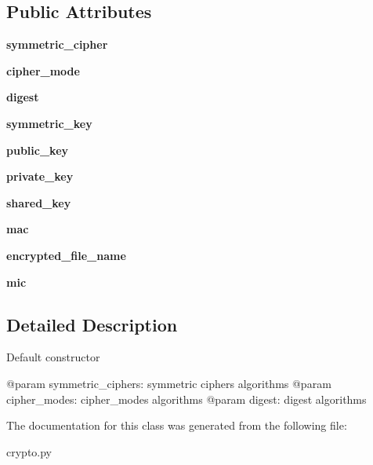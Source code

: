 \subsection*{Public Attributes}
\begin{DoxyCompactItemize}
\item 
\mbox{\label{classcrypto_1_1Crypto_ab5dad6394c3cecc06d883714d5611b62}} 
{\bfseries symmetric\+\_\+cipher}
\item 
\mbox{\label{classcrypto_1_1Crypto_aeac86424f33c6c441466ab4d29b5b95a}} 
{\bfseries cipher\+\_\+mode}
\item 
\mbox{\label{classcrypto_1_1Crypto_ad7038643480e969f1b6e89477e0601ad}} 
{\bfseries digest}
\item 
\mbox{\label{classcrypto_1_1Crypto_ae2441862a6341036638b064f6d625b3b}} 
{\bfseries symmetric\+\_\+key}
\item 
\mbox{\label{classcrypto_1_1Crypto_a0433ad7078ca0f9dc1633601d0e7b1db}} 
{\bfseries public\+\_\+key}
\item 
\mbox{\label{classcrypto_1_1Crypto_a7ec399ba9094ac42c752a65de8475053}} 
{\bfseries private\+\_\+key}
\item 
\mbox{\label{classcrypto_1_1Crypto_a200cf33f4b2685b21d02b32456c27078}} 
{\bfseries shared\+\_\+key}
\item 
\mbox{\label{classcrypto_1_1Crypto_a7e6bcc7d0319044f7b62723148a0a0f4}} 
{\bfseries mac}
\item 
\mbox{\label{classcrypto_1_1Crypto_a859d1d8c69b75a8357229b4af93ce54e}} 
{\bfseries encrypted\+\_\+file\+\_\+name}
\item 
\mbox{\label{classcrypto_1_1Crypto_a44ddb42691f8495c7e61f3a3aa0fc0e2}} 
{\bfseries mic}
\end{DoxyCompactItemize}


\subsection{Detailed Description}
\begin{DoxyVerb}Default constructor

@param symmetric_ciphers: symmetric ciphers algorithms
@param cipher_modes: cipher_modes algorithms
@param digest: digest algorithms
\end{DoxyVerb}
 

The documentation for this class was generated from the following file\+:\begin{DoxyCompactItemize}
\item 
crypto.\+py\end{DoxyCompactItemize}
